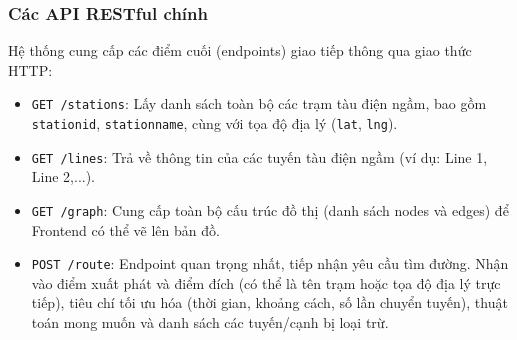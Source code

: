 \documentclass[12pt,a4paper]{article}
\begin{document}
\subsubsection{Các API RESTful chính}
Hệ thống cung cấp các điểm cuối (endpoints) giao tiếp thông qua giao thức HTTP:
\begin{itemize}
    \item \texttt{GET /stations}: Lấy danh sách toàn bộ các trạm tàu điện ngầm, bao gồm \texttt{stationid}, \texttt{stationname}, cùng với tọa độ địa lý (\texttt{lat}, \texttt{lng}).
    \item \texttt{GET /lines}: Trả về thông tin của các tuyến tàu điện ngầm (ví dụ: Line 1, Line 2,...).
    \item \texttt{GET /graph}: Cung cấp toàn bộ cấu trúc đồ thị (danh sách nodes và edges) để Frontend có thể vẽ lên bản đồ.
    \item \texttt{POST /route}: Endpoint quan trọng nhất, tiếp nhận yêu cầu tìm đường. Nhận vào điểm xuất phát và điểm đích (có thể là tên trạm hoặc tọa độ địa lý trực tiếp), tiêu chí tối ưu hóa (thời gian, khoảng cách, số lần chuyển tuyến), thuật toán mong muốn và danh sách các tuyến/cạnh bị loại trừ.
\end{itemize}
\end{document}
